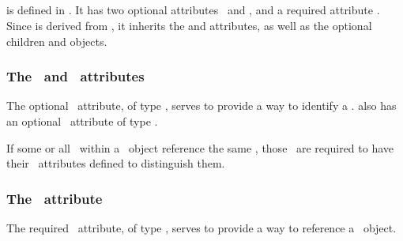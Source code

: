 \clearpage

\subsection{}
\label{def:CompartmentReference}

 is defined in . It has two optional attributes \idAtt\ and \nameAtt, and a required attribute \compartmentAtt.  Since  is derived from , it inherits the  and  attributes, as well as the optional children  and  objects. 

\subsubsection{The \idAtt\ and \nameAtt\ attributes}
\label{def:CompartmentReference:idAndName}

The optional \idAtt\ attribute, of type \SIdPT, serves to provide a way to identify a \compartmentReference. \CompartmentReference also has an optional \nameAtt\ attribute of type \stringPT. 

 If some or all \compartmentReferences\ within a \ListOfCompartmentReferences\ object reference the same , those \compartmentReferences\ are required to have their \idAtt\ attributes defined to distinguish them. 

\subsubsection{The \compartmentAtt\ attribute}
\label{def:CompartmentReference:compartment}

The required \compartmentAtt\ attribute, of type \SIdRefPT, serves to provide a way to reference a \ExCompartment\ object. 

\label{def:CompartmentCircularReferencesNotAllowed}

